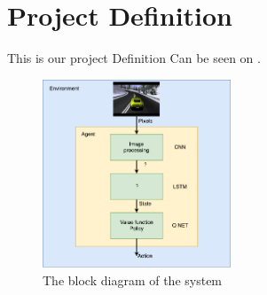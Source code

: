 \chapter{Project Definition}
\label{chap:projectdef}
This is our project Definition
\newline
Can be seen on .

\begin{figure}[H]
	\centering
	\includegraphics[width=0.5\textwidth]{Figures/Project_definition_block_diagram}
	\caption{The block diagram of the system}
	\label{fig:Project_Definition}
\end{figure}

